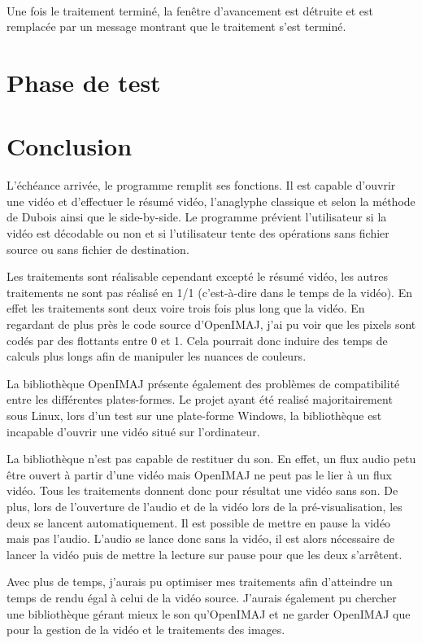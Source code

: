 \documentclass[10pt,a4paper]{article}
\begin{document}

~~\\

Une fois le traitement terminé, la fenêtre d'avancement est détruite et est remplacée par un message montrant que le traitement s'est terminé.


\section{Phase de test}

\section{Conclusion}

L'échéance arrivée, le programme remplit ses fonctions. Il est capable d'ouvrir une vidéo et d'effectuer le résumé vidéo, l'anaglyphe classique et selon la méthode de Dubois ainsi que le side-by-side. Le programme prévient l'utilisateur si la vidéo est décodable ou non et si l'utilisateur tente des opérations sans fichier source ou sans fichier de destination.

Les traitements sont réalisable cependant excepté le résumé vidéo, les autres traitements ne sont pas réalisé en 1/1 (c'est-à-dire dans le temps de la vidéo). En effet les traitements sont deux voire trois fois plus long que la vidéo. En regardant de plus près le code source d'OpenIMAJ, j'ai pu voir que les pixels sont codés par des flottants entre  0 et 1. Cela pourrait donc induire des temps de calculs plus longs afin de manipuler les nuances de couleurs.

La bibliothèque OpenIMAJ présente également des problèmes de compatibilité entre les différentes plates-formes. Le projet ayant été realisé majoritairement sous Linux, lors d'un test sur une plate-forme Windows, la bibliothèque est incapable d'ouvrir une vidéo situé sur l'ordinateur.

La bibliothèque n'est pas capable de restituer du son. En effet, un flux audio petu être ouvert à partir d'une vidéo mais OpenIMAJ ne peut pas le lier à un flux vidéo. Tous les traitements donnent donc pour résultat une vidéo sans son. De plus, lors de l'ouverture de l'audio et de la vidéo lors de la pré-visualisation, les deux se lancent automatiquement. Il est possible de mettre en pause la vidéo mais pas l'audio. L'audio se lance donc sans la vidéo, il est alors nécessaire de lancer la vidéo puis de mettre la lecture sur pause pour que les deux s'arrêtent.

Avec plus de temps, j'aurais pu optimiser mes traitements afin d'atteindre un temps de rendu égal à celui de la vidéo source. J'aurais également pu chercher une bibliothèque gérant mieux le son qu'OpenIMAJ et ne garder OpenIMAJ que pour la gestion de la vidéo et le traitements des images.





\newpage

\end{document}
